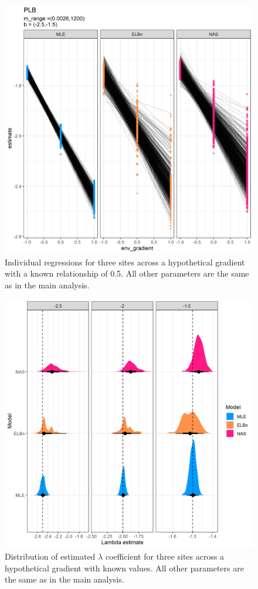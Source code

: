 \documentclass[
]{article}
\begin{document}
\begin{figure}
\centering
\includegraphics{figures/PLB_3_sites_main.png}
\caption{Individual regressions for three sites across a hypothetical
gradient with a known relationship of 0.5. All other parameters are the
same as in the main analysis.}
\end{figure}

\newpage

\begin{figure}
\centering
\includegraphics{figures/PLB_3_sites_est_b_density.png}
\caption{Distribution of estimated \(\lambda\) coefficient for three
sites across a hypothetical gradient with known values. All other
parameters are the same as in the main analysis.}
\end{figure}
\end{document}
